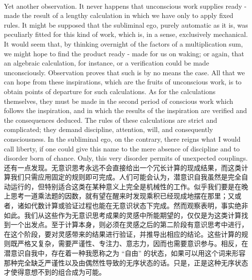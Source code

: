 \documentclass{article}
\begin{document}
\\
Yet another observation. It never happens that unconscious work supplies ready - made the result of a lengthy calculation in which we have only to apply fixed rules. It might be supposed that the subliminal ego, purely automatic as it is, was peculiarly fitted for this kind of work, which is, in a sense, exclusively mechanical. It would seem that, by thinking overnight of the factors of a multiplication sum, we might hope to find the product ready - made for us on waking; or again, that an algebraic calculation, for instance, or a verification could be made unconsciously. Observation proves that such is by no means the case. All that we can hope from these inspirations, which are the fruits of unconscious work, is to obtain points of departure for such calculations. As for the calculations themselves, they must be made in the second period of conscious work which follows the inspiration, and in which the results of the inspiration are verified and the consequences deduced. The rules of these calculations are strict and complicated; they demand discipline, attention, will, and consequently consciousness. In the subliminal ego, on the contrary, there reigns what I would call liberty, if one could give this name to the mere absence of discipline and to disorder born of chance. Only, this very disorder permits of unexpected couplings.\\
还有一点发现。无意识思考永远不会直接给出一个冗长计算的现成结果，而这类计算我们只需应用固定的规则即可完成。人们可能会认为，潜意识自我虽然是完全自动运行的，但特别适合这类在某种意义上完全是机械性的工作。似乎我们要是在晚上思考一道乘法题的因数，就有望在醒来时发现乘积已经现成地摆在那里；又或者，诸如代数计算或验证过程也能在无意识状态下完成。然而观察表明，事实绝非如此。我们从这些作为无意识思考成果的灵感中所能期望的，仅仅是为这类计算找到一个出发点。至于计算本身，则必须在灵感之后的第二阶段有意识思考中进行，在这个阶段，要对灵感带来的结果进行验证，并推导出相应的结论。这些计算的规则既严格又复杂，需要严谨性、专注力、意志力，因而也需要意识参与。相反，在潜意识自我中，存在着一种我愿称之为 “自由” 的状态，如果可以用这个词来形容那种完全缺乏严谨性以及由偶然性导致的无序状态的话。只是，正是这种无序状态才使得意想不到的组合成为可能。 \\ 
\end{document}
